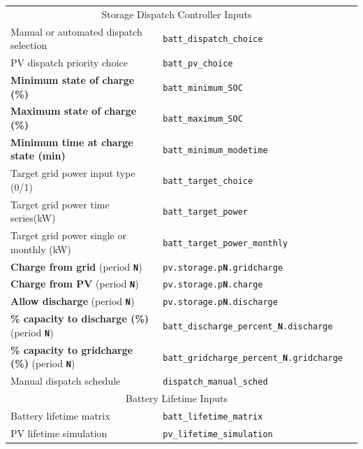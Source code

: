 \documentclass[12pt,letterpaper]{article}
\begin{document}
\begin{table}
\begin{center}
\begin{tabular}{lll}
\midrule
\multicolumn{2}{c}{Storage Dispatch Controller Inputs}\\
Manual or automated dispatch selection & \texttt{batt\_dispatch\_choice} \\
PV dispatch priority choice & \texttt{batt\_pv\_choice} \\
\textbf{Minimum state of charge (\%)} & \texttt{batt\_minimum\_SOC} \\
\textbf{Maximum state of charge (\%)} & \texttt{batt\_maximum\_SOC} \\
\textbf{Minimum time at charge state (min)} & \texttt{batt\_minimum\_modetime} \\
Target grid power input type (0/1) & \texttt{batt\_target\_choice}\\
Target grid power time series(kW) & \texttt{batt\_target\_power}\\
Target grid power single or monthly (kW) & \texttt{batt\_target\_power\_monthly}\\
\textbf{Charge from grid} (period \texttt{\textbf{N}}) & \texttt{pv.storage.p\textbf{N}.gridcharge} \\
\textbf{Charge from PV} (period \texttt{\textbf{N}}) & \texttt{pv.storage.p\textbf{N}.charge} \\
\textbf{Allow discharge} (period \texttt{\textbf{N}}) & \texttt{pv.storage.p\textbf{N}.discharge} \\
\textbf{\% capacity to discharge (\%)} (period \texttt{\textbf{N}}) & \texttt{batt\_discharge\_percent\_\textbf{N}.discharge} \\
\textbf{\% capacity to gridcharge (\%)} (period \texttt{\textbf{N}}) & \texttt{batt\_gridcharge\_percent\_\textbf{N}.gridcharge} \\
Manual dispatch schedule & \texttt{dispatch\_manual\_sched} \\
\midrule
\multicolumn{2}{c}{Battery Lifetime Inputs}\\
Battery lifetime matrix & \texttt{batt\_lifetime\_matrix} \\
PV lifetime simulation & \texttt{pv\_lifetime\_simulation} \\
\hline
\end{tabular}
\label{tab-batteryinputs}
\end{center}
\end{table}
\end{document}
